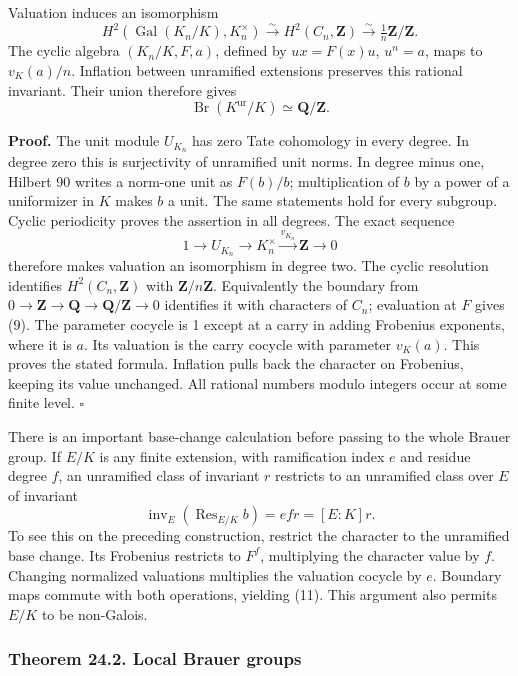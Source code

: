 \documentclass[11pt,a4paper]{article}
\begin{document}
Valuation induces an isomorphism \[
H^2(\operatorname{Gal}(K_n/K),K_n^\times)
\xrightarrow{\sim}H^2(C_n,\mathbf Z)
\xrightarrow{\sim}\tfrac1n\mathbf Z/\mathbf Z.
\tag{9}
\] The cyclic algebra \((K_n/K,F,a)\), defined by \(ux=F(x)u\),
\(u^n=a\), maps to \(v_K(a)/n\). Inflation between unramified extensions
preserves this rational invariant. Their union therefore gives \[
\operatorname{Br}(K^{\mathrm{ur}}/K)\simeq\mathbf Q/\mathbf Z.
\tag{10}
\]

\textbf{Proof.} The unit module \(U_{K_n}\) has zero Tate cohomology in
every degree. In degree zero this is surjectivity of unramified unit
norms. In degree minus one, Hilbert 90 writes a norm-one unit as
\(F(b)/b\); multiplication of \(b\) by a power of a uniformizer in \(K\)
makes \(b\) a unit. The same statements hold for every subgroup. Cyclic
periodicity proves the assertion in all degrees. The exact sequence \[
1\to U_{K_n}\to K_n^\times\xrightarrow{v_{K_n}}\mathbf Z\to0
\] therefore makes valuation an isomorphism in degree two. The cyclic
resolution identifies \(H^2(C_n,\mathbf Z)\) with
\(\mathbf Z/n\mathbf Z\). Equivalently the boundary from
\(0\to\mathbf Z\to\mathbf Q\to\mathbf Q/\mathbf Z\to0\) identifies it
with characters of \(C_n\); evaluation at \(F\) gives (9). The parameter
cocycle is 1 except at a carry in adding Frobenius exponents, where it
is \(a\). Its valuation is the carry cocycle with parameter \(v_K(a)\).
This proves the stated formula. Inflation pulls back the character on
Frobenius, keeping its value unchanged. All rational numbers modulo
integers occur at some finite level. \(\square\)

There is an important base-change calculation before passing to the
whole Brauer group. If \(E/K\) is any finite extension, with
ramification index \(e\) and residue degree \(f\), an unramified class
of invariant \(r\) restricts to an unramified class over \(E\) of
invariant \[
\operatorname{inv}_E(\operatorname{Res}_{E/K}b)=efr=[E:K]r.
\tag{11}
\] To see this on the preceding construction, restrict the character to
the unramified base change. Its Frobenius restricts to \(F^f\),
multiplying the character value by \(f\). Changing normalized valuations
multiplies the valuation cocycle by \(e\). Boundary maps commute with
both operations, yielding (11). This argument also permits \(E/K\) to be
non-Galois.

\subsubsection{Theorem 24.2. Local Brauer
groups}\label{theorem-24.2.-local-brauer-groups}
\end{document}
